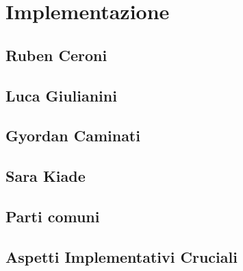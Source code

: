 \chapter{Implementazione}

\section{Ruben Ceroni}
\section{Luca Giulianini}
\section{Gyordan Caminati}
\section{Sara Kiade}
\section{Parti comuni}
\section{Aspetti Implementativi Cruciali}